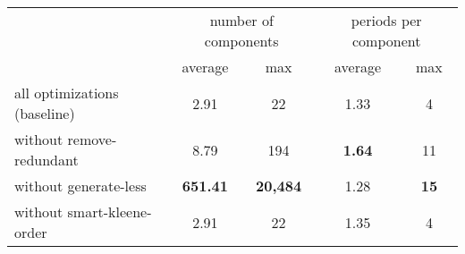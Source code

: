 \begin{table}[H]
	\centering
	\begin{tabular}{l c c c c}
		\toprule
		& \multicolumn{2}{c}{number of components} & \multicolumn{2}{c}{periods per component} \\
		\cmidrule(lr){2-3} \cmidrule(lr){4-5}
		& average & max & average & max \\
		\midrule
	all optimizations (baseline) & 2.91 & 22 & 1.33 & 4 \\
	without remove-redundant & 8.79 & 194 & \textbf{1.64} & 11 \\
	without generate-less & \textbf{651.41} & \textbf{20{,}484} & 1.28 & \textbf{15} \\
	without smart-kleene-order & 2.91 & 22 & 1.35 & 4 \\
  \bottomrule
	\end{tabular}
\end{table}
